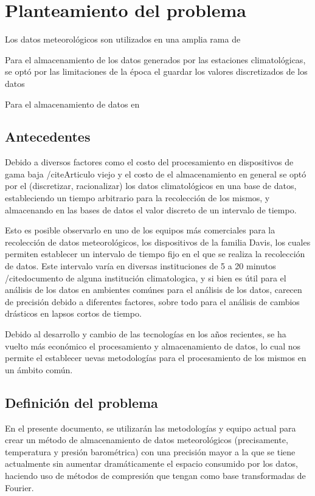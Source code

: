 \section{Planteamiento del problema}

Los datos meteorológicos son utilizados en una amplia rama de


Para el almacenamiento de los datos generados por las estaciones climatológicas, se optó por las limitaciones de la época el guardar los valores discretizados de los datos \cite{Marshall_1994}

Para el almacenamiento de datos en

\subsection{Antecedentes}

Debido a diversos factores como el costo del procesamiento en dispositivos de gama baja /cite{Articulo viejo} y el costo de el almacenamiento en general \cite{Marshall_1994} se optó por el (discretizar, racionalizar) los datos climatológicos en una base de datos, estableciendo un tiempo arbitrario para la recolección de los mismos, y almacenando en las bases de datos el valor discreto de un intervalo de tiempo.

Esto es posible observarlo en uno de los equipos más comerciales para la recolección de datos meteorológicos, los dispositivos de la familia Davis, los cuales permiten establecer un intervalo de tiempo fijo en el que se realiza la recolección de datos. Este intervalo varía en diversas instituciones de 5 a 20 minutos /cite{documento de alguna institución climatologica}, y si bien es útil para el análisis de los datos en ambientes comúnes para el análisis de los datos, carecen de precisión debido a diferentes factores, sobre todo para el análisis de cambios drásticos en lapsos cortos de tiempo.

Debido al desarrollo y cambio de las tecnologías en los años recientes, se ha vuelto más económico el procesamiento y almacenamiento de datos, lo cual nos permite el establecer uevas metodologías para el procesamiento de los mismos en un ámbito común.

\subsection{Definición del problema}

En el presente documento, se utilizarán las metodologías y equipo actual para crear un método de almacenamiento de datos meteorológicos (precisamente, temperatura y presión barométrica) con una precisión mayor a la que se tiene actualmente sin aumentar dramáticamente el espacio consumido por los datos, haciendo uso de métodos de compresión que tengan como base transformadas de Fourier.
